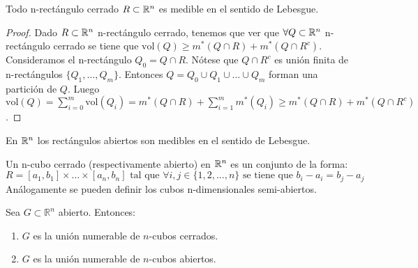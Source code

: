 \begin{proposición}
Todo n-rectángulo cerrado $R \subset \mathbb{R}^n$ es medible en el sentido de Lebesgue.
\end{proposición}

\begin{proof}
    Dado $R \subset \mathbb{R}^n$ n-rectángulo cerrado, tenemos que ver que $\forall Q \subset \mathbb{R}^n$ n-rectángulo cerrado se tiene que $\text{vol}(Q) \geq m^*(Q \cap R) + m^*(Q \cap R^c)$. Consideramos el n-rectángulo $Q_0 = Q \cap R$. Nótese que $Q \cap R^c$ es unión finita de n-rectángulos $\{Q_1,\ldots, Q_m\}$. Entonces $Q = Q_0 \cup Q_1 \cup \ldots \cup Q_m$ forman una partición de $Q$. Luego $\text{vol}(Q) = \sum_{i=0}^m \text{vol}(Q_i) = m^*(Q \cap R) + \sum_{i=1}^m m^*(Q_i) \geq m^*(Q \cap R) + m^*(Q \cap R^c)$.
\end{proof}

\begin{observación}
En $\mathbb{R}^n$ los rectángulos abiertos son medibles en el sentido de Lebesgue.
\end{observación}

\begin{definición}
Un n-cubo cerrado (respectivamente abierto) en $\mathbb{R}^n$ es un conjunto de la forma:
\[
    R = [a_1, b_1] \times \ldots \times [a_n, b_n] \text{ tal que } \forall i,j \in \{1,2,...,n\} \text{ se tiene que } b_i - a_i = b_j - a_j
\]
Análogamente se pueden definir los cubos n-dimensionales semi-abiertos.
\end{definición}


\begin{teorema}
    Sea $G \subset \mathbb{R}^n$ abierto. Entonces:
    \vspace{-0.5em}
    \begin{enumerate}
        \item $G$ es la unión numerable de $n$-cubos cerrados.
        \item $G$ es la unión numerable de $n$-cubos abiertos.
    \end{enumerate}
    \label{teoremaCubosAbiertosCerrados}
\end{teorema}

